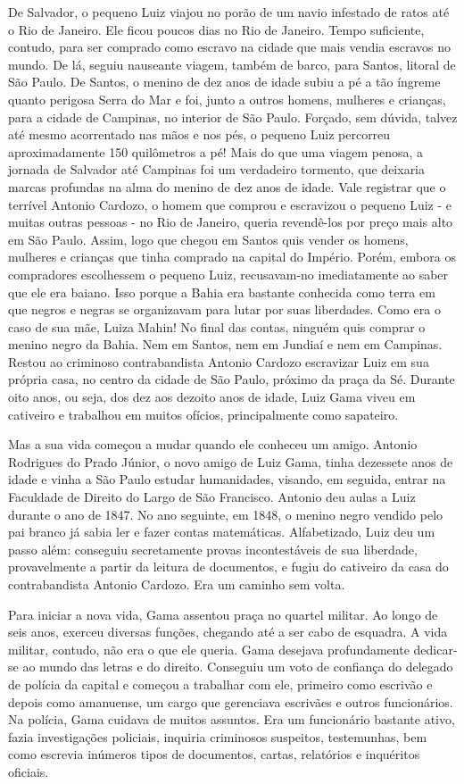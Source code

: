 De Salvador, o pequeno Luiz viajou no porão de um navio infestado de
ratos até o Rio de Janeiro. Ele ficou poucos dias no Rio de Janeiro.
Tempo suficiente, contudo, para ser comprado como escravo na cidade que
mais vendia escravos no mundo. De lá, seguiu nauseante viagem, também de
barco, para Santos, litoral de São Paulo. De Santos, o menino de dez
anos de idade subiu a pé a tão íngreme quanto perigosa Serra do Mar e
foi, junto a outros homens, mulheres e crianças, para a cidade de
Campinas, no interior de São Paulo. Forçado, sem dúvida, talvez até
mesmo acorrentado nas mãos e nos pés, o pequeno Luiz percorreu
aproximadamente 150 quilômetros a pé! Mais do que uma viagem penosa, a
jornada de Salvador até Campinas foi um verdadeiro tormento, que
deixaria marcas profundas na alma do menino de dez anos de idade. Vale
registrar que o terrível Antonio Cardozo, o homem que comprou e
escravizou o pequeno Luiz - e muitas outras pessoas - no Rio de Janeiro,
queria revendê-los por preço mais alto em São Paulo. Assim, logo que
chegou em Santos quis vender os homens, mulheres e crianças que tinha
comprado na capital do Império. Porém, embora os compradores escolhessem
o pequeno Luiz, recusavam-no imediatamente ao saber que ele era baiano.
Isso porque a Bahia era bastante conhecida como terra em que negros e
negras se organizavam para lutar por suas liberdades. Como era o caso de
sua mãe, Luiza Mahin! No final das contas, ninguém quis comprar o menino
negro da Bahia. Nem em Santos, nem em Jundiaí e nem em Campinas. Restou
ao criminoso contrabandista Antonio Cardozo escravizar Luiz em sua
própria casa, no centro da cidade de São Paulo, próximo da praça da Sé.
Durante oito anos, ou seja, dos dez aos dezoito anos de idade, Luiz Gama
viveu em cativeiro e trabalhou em muitos ofícios, principalmente como
sapateiro.

Mas a sua vida começou a mudar quando ele conheceu um amigo. Antonio
Rodrigues do Prado Júnior, o novo amigo de Luiz Gama, tinha dezessete
anos de idade e vinha a São Paulo estudar humanidades, visando, em
seguida, entrar na Faculdade de Direito do Largo de São Francisco.
Antonio deu aulas a Luiz durante o ano de 1847. No ano seguinte, em
1848, o menino negro vendido pelo pai branco já sabia ler e fazer contas
matemáticas. Alfabetizado, Luiz deu um passo além: conseguiu
secretamente provas incontestáveis de sua liberdade, provavelmente a
partir da leitura de documentos, e fugiu do cativeiro da casa do
contrabandista Antonio Cardozo. Era um caminho sem volta.

Para iniciar a nova vida, Gama assentou praça no quartel militar. Ao
longo de seis anos, exerceu diversas funções, chegando até a ser cabo de
esquadra. A vida militar, contudo, não era o que ele queria. Gama
desejava profundamente dedicar-se ao mundo das letras e do direito.
Conseguiu um voto de confiança do delegado de polícia da capital e
começou a trabalhar com ele, primeiro como escrivão e depois como
amanuense, um cargo que gerenciava escrivães e outros funcionários. Na
polícia, Gama cuidava de muitos assuntos. Era um funcionário bastante
ativo, fazia investigações policiais, inquiria criminosos suspeitos,
testemunhas, bem como escrevia inúmeros tipos de documentos, cartas,
relatórios e inquéritos oficiais.

